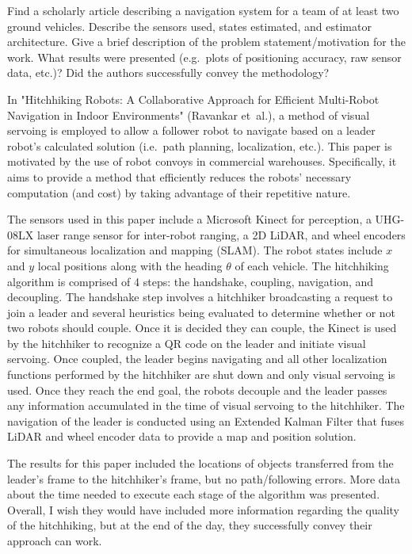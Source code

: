 \documentclass[12pt,letterpaper, onecolumn]{exam}
\begin{document}
\begin{questions}
    \question
    Find a scholarly article describing a navigation system for a team of at least two ground
    vehicles. Describe the sensors used, states estimated, and estimator architecture. Give a
    brief description of the problem statement/motivation for the work. What results were
    presented (e.g.\ plots of positioning accuracy, raw sensor data, etc.)? Did the authors
    successfully convey the methodology?

    \solution
    In "Hitchhiking Robots: A Collaborative Approach for Efficient Multi-Robot Navigation in Indoor Environments" (Ravankar et\ al.), a method of visual servoing is employed to allow a follower robot to navigate based on a leader robot's calculated solution (i.e.\ path planning, localization, etc.). This paper is motivated by the use of robot convoys in commercial warehouses. Specifically, it aims to provide a method that efficiently reduces the robots' necessary computation (and cost) by taking advantage of their repetitive nature.

    The sensors used in this paper include a Microsoft Kinect for perception, a UHG-08LX laser range sensor for inter-robot ranging, a 2D LiDAR, and wheel encoders for simultaneous localization and mapping (SLAM). The robot states include $x$ and $y$ local positions along with the heading $\theta$ of each vehicle. The hitchhiking algorithm is comprised of 4 steps: the handshake, coupling, navigation, and decoupling. The handshake step involves a hitchhiker broadcasting a request to join a leader and several heuristics being evaluated to determine whether or not two robots should couple. Once it is decided they can couple, the Kinect is used by the hitchhiker to recognize a QR code on the leader and initiate visual servoing. Once coupled, the leader begins navigating and all other localization functions performed by the hitchhiker are shut down and only visual servoing is used. Once they reach the end goal, the robots decouple and the leader passes any information accumulated in the time of visual servoing to the hitchhiker. The navigation of the leader is conducted using an Extended Kalman Filter that fuses LiDAR and wheel encoder data to provide a map and position solution.

    The results for this paper included the locations of objects transferred from the leader's frame to the hitchhiker's frame, but no path/following errors. More data about the time needed to execute each stage of the algorithm was presented. Overall, I wish they would have included more information regarding the quality of the hitchhiking, but at the end of the day, they successfully convey their approach can work.


\end{questions}
\end{document}
